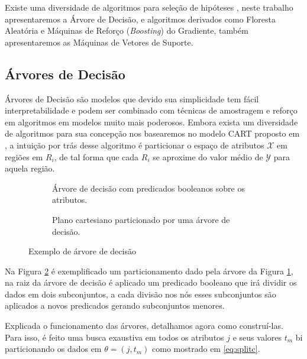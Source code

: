 Existe uma diversidade de algoritmos para seleção de hipóteses
\cite{bishop2006pattern,friedman2001elements}, neste trabalho apresentaremos a
Árvore de Decisão, e algoritmos derivados como Floresta Aleatória e Máquinas de
Reforço (\textit{Boosting}) do Gradiente, também apresentaremos as Máquinas de
Vetores de Suporte.

\subsection{Árvores de Decisão}
Árvores de Decisão são modelos que devido sua simplicidade tem fácil
interpretabilidade e podem ser combinado com técnicas de amostragem e reforço
em algoritmos em modelos muito mais poderosos. Embora exista um diversidade de
algoritmos para sua concepção nos basearemos no modelo CART proposto em
\cite{breiman1984classification}, a intuição por trás desse algoritmo é
particionar o espaço de atributos $\mathcal{X}$ em regiões em $R_i$, de
tal forma que cada $R_i$ se aproxime do valor médio de $\mathcal{Y}$ para
aquela região.

\begin{figure}[ht]
   \centering
    \begin{subfigure}{.4\textwidth}
        \centering
        \def\svgwidth{1.4\linewidth}
        \caption{Árvore de decisão com predicados booleanos sobre os atributos.}
        \label{fig:tree}
    \end{subfigure}
     \hfill
    \begin{subfigure}{.4\textwidth}
        \centering
        \def\svgwidth{.8\linewidth}
        \caption{Plano cartesiano particionado por uma árvore de decisão.}
        \label{fig:split}
    \end{subfigure}
    \caption{Exemplo de árvore de decisão}
    \label{fig:three graphs}
\end{figure}


Na Figura \ref{fig:split} é exemplificado um particionamento dado pela árvore
da Figura \ref{fig:tree}, na raiz da árvore de decisão é aplicado um predicado
booleano que irá dividir os dados em dois subconjuntos, a cada divisão nos nós
esses subconjuntos são aplicados a novos predicados gerando subconjuntos
menores.

Explicada o funcionamento das árvores, detalhamos agora como construí-las. Para
isso, é feito uma busca exaustiva em todos os atributos $j$ e seus valores
$t_m$ bi particionando os dados em $\theta = (j,t_m)$ como mostrado em
\ref{eq:splitc}.

